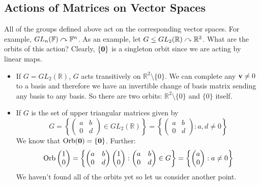 \subsection{Actions of Matrices on Vector Spaces}
All of the groups defined above act on the corresponding vector spaces.
For example, \(GL_n(\mathbb F) \curvearrowright \mathbb F^n\).
As an example, let \(G \leq GL_2(\mathbb R) \curvearrowright \mathbb R^2\).
What are the orbits of this action?
Clearly, \(\{ \vb 0 \}\) is a singleton orbit since we are acting by linear maps.
\begin{itemize}
	\item If \(G = GL_2(\mathbb R)\), \(G\) acts transitively on \(\mathbb R^2 \setminus \{ 0 \}\).
	      We can complete any \(\vb v \neq 0\) to a basis and therefore we have an invertible change of basis matrix sending any basis to any basis.
	      So there are two orbits: \(\mathbb R^2 \setminus \{ 0 \}\) and \(\{ 0 \}\) itself.
	\item If \(G\) is the set of upper triangular matrices given by
	      \[
		      G = \left\{ \begin{pmatrix}
			      a & b \\ 0 & d
		      \end{pmatrix} \in GL_2(\mathbb R) \right\} = \left\{ \begin{pmatrix}
			      a & b \\ 0 & d
		      \end{pmatrix}: a, d \neq 0 \right\}
	      \]
	      We know that \(\operatorname{Orb}(\vb 0) = \{ \vb 0 \}\).
	      Further:
	      \[
		      \operatorname{Orb}\begin{pmatrix}
			      1 \\ 0
		      \end{pmatrix} = \left\{ \begin{pmatrix}
			      a & b \\ 0 & d
		      \end{pmatrix} \begin{pmatrix}
			      1 \\ 0
		      \end{pmatrix}: \begin{pmatrix}
			      a & b \\ 0 & d
		      \end{pmatrix} \in G \right\} = \left\{ \begin{pmatrix}
			      a \\ 0
		      \end{pmatrix}: a \neq 0 \right\}
	      \]
	      We haven't found all of the orbits yet so let us consider another point.

\end{itemize}
